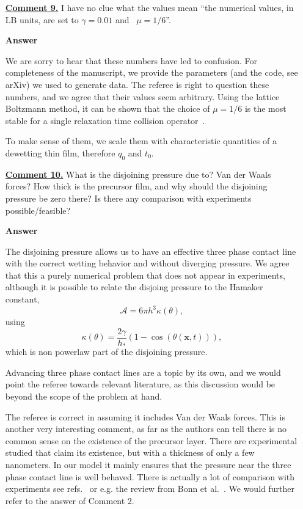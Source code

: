 \documentclass[12pt,english]{article}
\begin{document}
\begin{itemize}
\item[ \textbf{\underline{Comment 9.}}]
{ 
I have no clue what the values mean ``the numerical values, in LB units, are set to $\gamma= 0.01$ and  $\mu = 1/6$''. 
}

\item[ \textbf{{Answer}}]
{
We are sorry to hear that these numbers have led to confusion.
For completeness of the manuscript, we provide the parameters (and the code, see arXiv) we used to generate data.
The referee is right to question these numbers, and we agree that their values seem arbitrary.
Using the lattice Boltzmann method, it can be shown that the choice of $\mu = 1/6$ is the most stable for a single relaxation time collision operator~\cite{kruger2017lattice}.

To make sense of them, we scale them with characteristic quantities of a dewetting thin film, therefore $q_0$ and $t_0$.
}

\item[ \textbf{\underline{Comment 10.}}]
{ 
What is the disjoining pressure due to? 
Van der Waals forces? 
How thick is the precursor film, and why should the disjoining pressure be zero there?
Is there any comparison with experiments possible/feasible?
}

\item[ \textbf{{Answer}}]
{
The disjoining pressure allows us to have an effective three phase contact line with the correct wetting behavior and without diverging pressure.
We agree that this a purely numerical problem that does not appear in experiments, although it is possible to relate the disjoing pressure to the Hamaker constant,
\begin{equation*}
    \mathcal{A} = 6\pi h^3\kappa(\theta),
\end{equation*}
using 
\begin{equation*}
    \kappa(\theta) = \frac{2\gamma}{h_{\ast}}(1-\cos(\theta(\mathbf{x},t))),
\end{equation*}
which is non powerlaw part of the disjoining pressure.

Advancing three phase contact lines are a topic by its own, and we would point the referee towards relevant literature, as this discussion would be beyond the scope of the problem at hand.

The referee is correct in assuming it includes Van der Waals forces.
This is another very interesting comment, as far as the authors can tell there is no common sense on the existence of the precursor layer.
There are experimental studied that claim its existence, but with a thickness of only a few nanometers.
In our model it mainly ensures that the pressure near the three phase contact line is well behaved.
There is actually a lot of comparison with experiments see refs.~\cite{becker2003complex, fetzer2007thermal, doi:10.1073/pnas.1820487116} or e.g. the review from Bonn et al.~\cite{RevModPhys.81.739}.
We would further refer to the answer of Comment 2.
}

\end{itemize}
\end{document}
